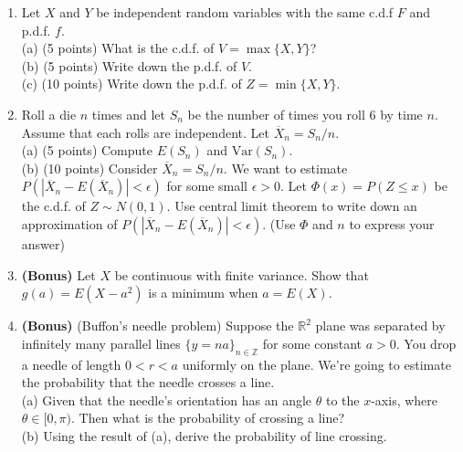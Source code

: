 \documentclass[14pt]{extarticle}
\begin{document}
\begin{enumerate}
    \item Let $X$ and $Y$ be independent random variables with the same c.d.f $F$ and p.d.f. $f$.\\
    (a) (5 points) What is the c.d.f. of $V=\max\{X,Y\}$?\\
    (b) (5 points) Write down the p.d.f. of $V$.\\
    (c) (10 points) Write down the p.d.f. of $Z=\min\{X,Y\}$.
    
    \item Roll a die $n$ times and let $S_n$ be the number of times you roll $6$ by time $n$. Assume that each rolls are independent. Let $\overline{X}_n=S_n/n$.\\
    (a) (5 points) Compute $E(S_n)$ and $\text{Var}(S_n)$.\\
    (b) (10 points) Consider $\overline{X}_n=S_n/n$. We want to estimate $P(|\overline{X}_n-E(\overline{X}_n)|<\epsilon)$ for some small $\epsilon>0$. Let $\Phi(x)=P(Z\leq x)$ be the c.d.f. of $Z\sim N(0,1)$. Use central limit theorem to write down an approximation of $P(|\overline{X}_n-E(\overline{X}_n)|<\epsilon)$. (Use $\Phi$ and $n$ to express your answer)
    
    \item \textbf{(Bonus)} Let $X$ be continuous with finite variance. Show that $g(a)=E(X-a^2)$ is a minimum when $a = E(X)$.
    
    \item \textbf{(Bonus)} (Buffon's needle problem) Suppose the $\mathbb{R}^2$ plane was separated by infinitely many parallel lines $\{y=na\}_{n\in\mathbb{Z}}$ for some constant $a>0$. You drop a needle of length $0<r<a$ uniformly on the plane. We're going to estimate the probability that the needle crosses a line.\\
    (a) Given that the needle's orientation has an angle $\theta$ to the $x$-axis, where $\theta\in[0,\pi)$. Then what is the probability of crossing a line?\\
    (b) Using the result of (a), derive the probability of line crossing.


\end{enumerate}
\end{document}

